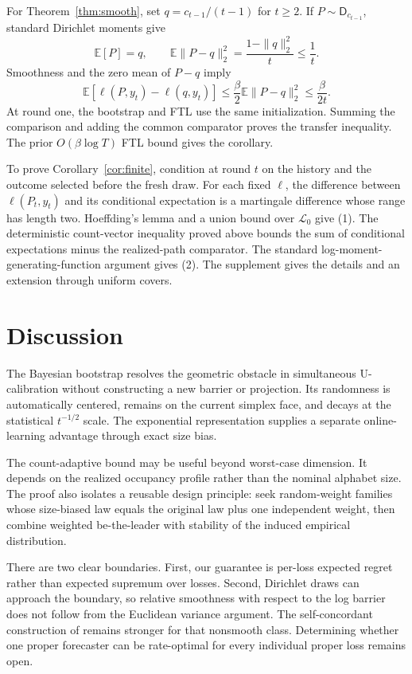 \documentclass[twoside]{article}
\newcommand{\E}{\mathbb E}
\newcommand{\D}{\mathsf D}
\begin{document}
For Theorem~\ref{thm:smooth}, set $q=c_{t-1}/(t-1)$ for $t\geq2$. If $P\sim\D_{c_{t-1}}$, standard Dirichlet moments give \[ \E[P]=q, \qquad \E\|P-q\|_2^2=\frac{1-\|q\|_2^2}{t}\leq\frac1t. \tag{9} \] Smoothness and the zero mean of $P-q$ imply \[ \E[\ell(P,y_t)-\ell(q,y_t)] \leq\frac\beta2\E\|P-q\|_2^2 \leq\frac\beta{2t}. \] At round one, the bootstrap and FTL use the same initialization. Summing the comparison and adding the common comparator proves the transfer inequality. The prior $O(\beta\log T)$ FTL bound gives the corollary.

To prove Corollary~\ref{cor:finite}, condition at round $t$ on the history and the outcome selected before the fresh draw. For each fixed $\ell$, the difference between $\ell(P_t,y_t)$ and its conditional expectation is a martingale difference whose range has length two. Hoeffding's lemma and a union bound over $\mathcal L_0$ give (1). The deterministic count-vector inequality proved above bounds the sum of conditional expectations minus the realized-path comparator. The standard log-moment-generating-function argument gives (2). The supplement gives the details and an extension through uniform covers.

\section{Discussion}

The Bayesian bootstrap resolves the geometric obstacle in simultaneous U-calibration without constructing a new barrier or projection. Its randomness is automatically centered, remains on the current simplex face, and decays at the statistical $t^{-1/2}$ scale. The exponential representation supplies a separate online-learning advantage through exact size bias.

The count-adaptive bound may be useful beyond worst-case dimension. It depends on the realized occupancy profile rather than the nominal alphabet size. The proof also isolates a reusable design principle: seek random-weight families whose size-biased law equals the original law plus one independent weight, then combine weighted be-the-leader with stability of the induced empirical distribution.

There are two clear boundaries. First, our guarantee is per-loss expected regret rather than expected supremum over losses. Second, Dirichlet draws can approach the boundary, so relative smoothness with respect to the log barrier does not follow from the Euclidean variance argument. The self-concordant construction of \citet{frongillo2026} remains stronger for that nonsmooth class. Determining whether one proper forecaster can be rate-optimal for every individual proper loss remains open.
\end{document}

